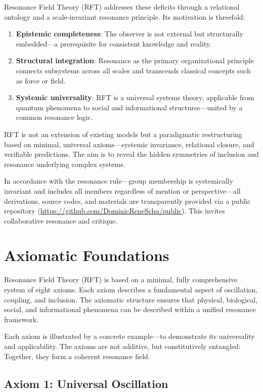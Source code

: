 \documentclass[12pt]{iopart}
\begin{document}
Resonance Field Theory (RFT) addresses these deficits through a relational ontology and a scale-invariant resonance principle. Its motivation is threefold:

\begin{enumerate}
	\item \textbf{Epistemic completeness}: The observer is not external but structurally embedded—a prerequisite for consistent knowledge and reality.
	\item \textbf{Structural integration}: Resonance as the primary organizational principle connects subsystems across all scales and transcends classical concepts such as force or field.
	\item \textbf{Systemic universality}: RFT is a universal systems theory, applicable from quantum phenomena to social and informational structures—united by a common resonance logic.
\end{enumerate}

RFT is not an extension of existing models but a paradigmatic restructuring based on minimal, universal axioms—systemic invariance, relational closure, and verifiable predictions. The aim is to reveal the hidden symmetries of inclusion and resonance underlying complex systems.

In accordance with the resonance rule—group membership is systemically invariant and includes all members regardless of mention or perspective—all derivations, source codes, and materials are transparently provided via a public repository (\url{https://github.com/DominicReneSchu/public}). This invites collaborative resonance and critique.

\section{Axiomatic Foundations}

Resonance Field Theory (RFT) is based on a minimal, fully comprehensive system of eight axioms. Each axiom describes a fundamental aspect of oscillation, coupling, and inclusion. The axiomatic structure ensures that physical, biological, social, and informational phenomena can be described within a unified resonance framework.

Each axiom is illustrated by a concrete example—to demonstrate its universality and applicability. The axioms are not additive, but constitutively entangled: Together, they form a coherent resonance field.

\subsection{Axiom 1: Universal Oscillation}
\end{document}
